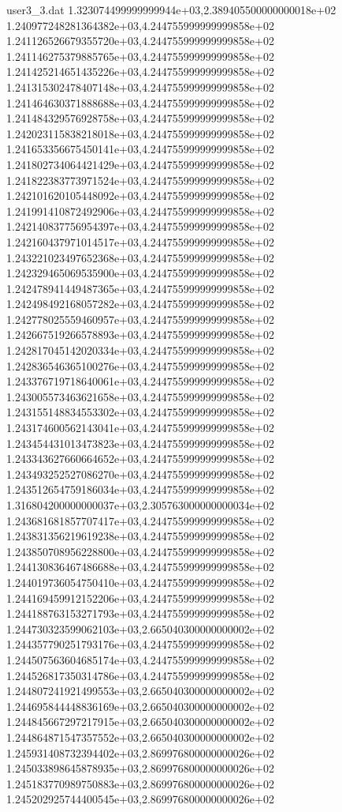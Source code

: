 \begin{filecontents}{user3_3.dat}
1.323074499999999944e+03,2.389405500000000018e+02
1.240977248281364382e+03,4.244755999999999858e+02
1.241126526679355720e+03,4.244755999999999858e+02
1.241146275379885765e+03,4.244755999999999858e+02
1.241425214651435226e+03,4.244755999999999858e+02
1.241315302478407148e+03,4.244755999999999858e+02
1.241464630371888688e+03,4.244755999999999858e+02
1.241484329576928758e+03,4.244755999999999858e+02
1.242023115838218018e+03,4.244755999999999858e+02
1.241653356675450141e+03,4.244755999999999858e+02
1.241802734064421429e+03,4.244755999999999858e+02
1.241822383773971524e+03,4.244755999999999858e+02
1.242101620105448092e+03,4.244755999999999858e+02
1.241991410872492906e+03,4.244755999999999858e+02
1.242140837756954397e+03,4.244755999999999858e+02
1.242160437971014517e+03,4.244755999999999858e+02
1.243221023497652368e+03,4.244755999999999858e+02
1.242329465069535900e+03,4.244755999999999858e+02
1.242478941449487365e+03,4.244755999999999858e+02
1.242498492168057282e+03,4.244755999999999858e+02
1.242778025559460957e+03,4.244755999999999858e+02
1.242667519266578893e+03,4.244755999999999858e+02
1.242817045142020334e+03,4.244755999999999858e+02
1.242836546365100276e+03,4.244755999999999858e+02
1.243376719718640061e+03,4.244755999999999858e+02
1.243005573463621658e+03,4.244755999999999858e+02
1.243155148834553302e+03,4.244755999999999858e+02
1.243174600562143041e+03,4.244755999999999858e+02
1.243454431013473823e+03,4.244755999999999858e+02
1.243343627660664652e+03,4.244755999999999858e+02
1.243493252527086270e+03,4.244755999999999858e+02
1.243512654759186034e+03,4.244755999999999858e+02
1.316804200000000037e+03,2.305763000000000034e+02
1.243681681857707417e+03,4.244755999999999858e+02
1.243831356219619238e+03,4.244755999999999858e+02
1.243850708956228800e+03,4.244755999999999858e+02
1.244130836467486688e+03,4.244755999999999858e+02
1.244019736054750410e+03,4.244755999999999858e+02
1.244169459912152206e+03,4.244755999999999858e+02
1.244188763153271793e+03,4.244755999999999858e+02
1.244730323599062103e+03,2.665040300000000002e+02
1.244357790251793176e+03,4.244755999999999858e+02
1.244507563604685174e+03,4.244755999999999858e+02
1.244526817350314786e+03,4.244755999999999858e+02
1.244807241921499553e+03,2.665040300000000002e+02
1.244695844448836169e+03,2.665040300000000002e+02
1.244845667297217915e+03,2.665040300000000002e+02
1.244864871547357552e+03,2.665040300000000002e+02
1.245931408732394402e+03,2.869976800000000026e+02
1.245033898645878935e+03,2.869976800000000026e+02
1.245183770989750883e+03,2.869976800000000026e+02
1.245202925744400545e+03,2.869976800000000026e+02

\end{filecontents}
